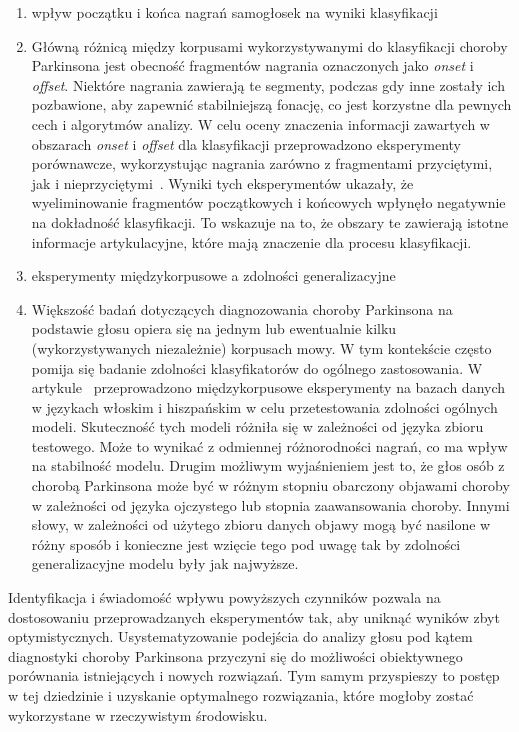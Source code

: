 \begin{enumerate}[label={\alph*)}]
	\item wpływ początku i końca  nagrań samogłosek na wyniki klasyfikacji
\item[] Główną różnicą między korpusami wykorzystywanymi do klasyfikacji choroby Parkinsona jest obecność fragmentów nagrania oznaczonych jako \emph{onset} i \emph{offset}.
Niektóre nagrania zawierają te segmenty, podczas gdy inne zostały ich pozbawione, aby zapewnić stabilniejszą fonację, co jest korzystne dla pewnych cech i algorytmów analizy.
W celu oceny znaczenia informacji zawartych w obszarach \emph{onset} i \emph{offset} dla klasyfikacji przeprowadzono eksperymenty porównawcze,
wykorzystując nagrania zarówno z fragmentami przyciętymi, jak i nieprzyciętymi~\cite{SustainedVowelsProblems}.
Wyniki tych eksperymentów ukazały, że wyeliminowanie fragmentów początkowych i końcowych wpłynęło negatywnie na dokładność klasyfikacji.
To wskazuje na to, że obszary te zawierają istotne informacje artykulacyjne, które mają znaczenie dla procesu klasyfikacji.

 	\item eksperymenty międzykorpusowe a zdolności generalizacyjne
	\item [] Większość badań dotyczących diagnozowania choroby Parkinsona na podstawie głosu opiera się na jednym lub ewentualnie kilku (wykorzystywanych niezależnie)
korpusach mowy.
W tym kontekście często pomija się badanie zdolności klasyfikatorów do ogólnego zastosowania.
W artykule~\cite{SustainedVowelsProblems} przeprowadzono międzykorpusowe eksperymenty na bazach danych w językach włoskim i hiszpańskim w celu
przetestowania zdolności ogólnych modeli.
Skuteczność tych modeli różniła się w zależności od języka zbioru testowego.
Może to wynikać z odmiennej różnorodności nagrań, co ma wpływ na stabilność modelu.
Drugim możliwym wyjaśnieniem jest to, że głos osób z chorobą Parkinsona może być w różnym stopniu obarczony objawami choroby w zależności od języka ojczystego lub stopnia zaawansowania choroby.
Innymi słowy, w zależności od użytego zbioru danych objawy mogą być nasilone w różny sposób i konieczne jest wzięcie tego pod uwagę tak by zdolności generalizacyjne modelu były jak najwyższe.
\end{enumerate}


Identyfikacja i świadomość wpływu powyższych czynników pozwala na dostosowaniu przeprowadzanych eksperymentów tak, aby uniknąć wyników zbyt optymistycznych.
Usystematyzowanie podejścia do analizy głosu pod kątem diagnostyki choroby Parkinsona przyczyni się do możliwości obiektywnego porównania istniejących i nowych rozwiązań.
Tym samym przyspieszy to postęp w tej dziedzinie i uzyskanie optymalnego rozwiązania, które mogłoby zostać wykorzystane w rzeczywistym środowisku.

